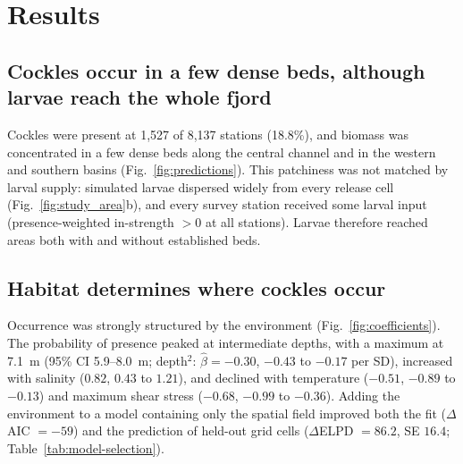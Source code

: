 


\section{Results}

\subsection{Cockles occur in a few dense beds, although larvae reach the whole fjord}

Cockles were present at 1{,}527 of 8{,}137 stations (18.8\%), and biomass was concentrated in a few dense beds along the central channel and in the western and southern basins (Fig.~\ref{fig:predictions}). This patchiness was not matched by larval supply: simulated larvae dispersed widely from every release cell (Fig.~\ref{fig:study_area}b), and every survey station received some larval input (presence-weighted in-strength $>0$ at all stations). Larvae therefore reached areas both with and without established beds.

\subsection{Habitat determines where cockles occur}

Occurrence was strongly structured by the environment (Fig.~\ref{fig:coefficients}). The probability of presence peaked at intermediate depths, with a maximum at 7.1~m (95\% CI 5.9--8.0~m; depth$^2$: $\hat{\beta}=-0.30$, $-0.43$ to $-0.17$ per SD), increased with salinity ($0.82$, $0.43$ to $1.21$), and declined with temperature ($-0.51$, $-0.89$ to $-0.13$) and maximum shear stress ($-0.68$, $-0.99$ to $-0.36$). Adding the environment to a model containing only the spatial field improved both the fit ($\Delta$AIC $=-59$) and the prediction of held-out grid cells ($\Delta$ELPD $=86.2$, SE $16.4$; Table~\ref{tab:model-selection}).


